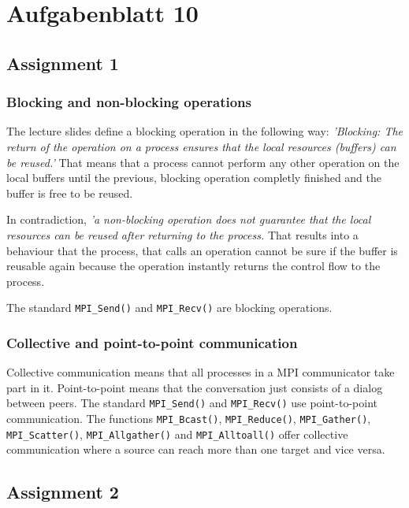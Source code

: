 \section{Aufgabenblatt 10}

\subsection{Assignment 1}
	\subsubsection*{Blocking and non-blocking operations}
		The lecture slides define a blocking operation in the following way: 
		\textit{'Blocking: The return of the operation on a process ensures that the local resources (buffers) can be reused.'}
		That means that a process cannot perform any other operation on the local buffers until the previous, blocking operation completly finished and the buffer is free to be reused. 
		
		In contradiction, \textit{'a non-blocking operation does not guarantee that the local resources can be reused after returning to the process.} That results into a behaviour that the process, that calls an operation cannot be sure if the buffer is reusable again because the operation instantly returns the control flow to the process.
		
		The standard \texttt{MPI\_Send()} and \texttt{MPI\_Recv()} are blocking operations.

		
	\subsubsection*{Collective and point-to-point communication}
		Collective communication means that all processes in a MPI communicator	take part in it.  
		Point-to-point means that the conversation just consists of a dialog between peers.
		The standard \texttt{MPI\_Send()} and \texttt{MPI\_Recv()} use point-to-point communication. 
		The functions \texttt{MPI\_Bcast()}, \texttt{MPI\_Reduce()}, \texttt{MPI\_Gather()}, \texttt{MPI\_Scatter()}, \texttt{MPI\_Allgather()} and \texttt{MPI\_Alltoall()} offer collective communication where a source can reach more than one target and vice versa.
	
\subsection{Assignment 2}
